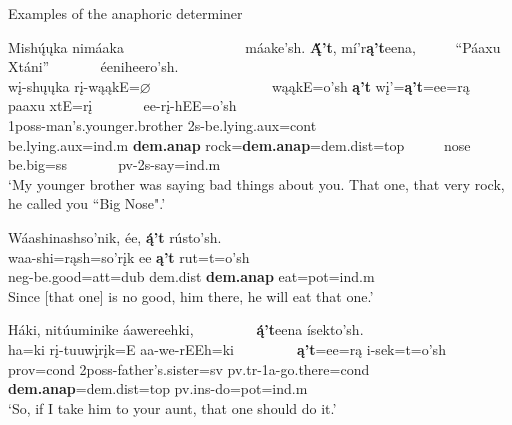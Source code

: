 \begin{exe}

\item\label{ExAnaphoricDets} Examples of the anaphoric determiner

\begin{xlist}

\item\label{ExAnaphoricDets1} \glll Mishų́ųka nimáaka ~ ~ ~ ~ ~ ~ ~ ~ ~ ~ máake'sh.  \textbf{Ą́'t}, mí'r\textbf{ą't}eena, ~ ~ ~  ``Páaxu Xtáni'' ~ ~ ~ ~ éeniheero'sh.\\
    wį-shųųka rį-wąąkE=$\varnothing$ ~ ~ ~ ~ ~ ~ ~ ~ ~ ~  wąąkE=o'sh \textbf{ą't} wį'=\textbf{ą't}=ee=rą ~ ~ ~ paaxu xtE=rį ~ ~ ~ ~  ee-rį-hEE=o'sh\\
    1poss-\textnormal{man's.younger.brother} 2s-\textnormal{be.lying}.aux=cont ~ ~ ~ ~ ~ ~ ~ ~ ~ ~ \textnormal{be.lying}.aux=ind.m \textbf{dem.anap} \textnormal{rock}=\textbf{dem.anap}=dem.dist=top ~ ~ ~ \textnormal{nose} \textnormal{be.big}=ss ~ ~ ~ ~ pv-2s-\textnormal{say}=ind.m\\
    \glt `My younger brother was saying bad things about you. That one, that very rock, he called you ``Big Nose{"}.' \citep[18]{hollow1973a}
    
\item\label{ExAnaphoricDets2} \glll Wáashinashso'nik, ée, \textbf{ą́'t} rústo'sh.\\
    waa-shi=rąsh=so'rįk ee \textbf{ą't} rut=t=o'sh\\
    neg-\textnormal{be.good}=att=dub dem.dist \textbf{dem.anap} \textnormal{eat}=pot=ind.m\\
    \glt Since [that one] is no good, him there, he will eat that one.' \citep[43]{hollow1973a}

\item\label{ExAnaphoricDets3} \glll Háki, nitúuminike áawereehki, ~ ~ ~ ~ ~  \textbf{ą́'t}eena ísekto'sh.\\
    ha=ki rį-tuuwįrįk=E aa-we-rEEh=ki ~ ~ ~ ~ ~ \textbf{ą't}=ee=rą i-sek=t=o'sh\\
    prov=cond 2poss-\textnormal{father's.sister}=sv pv.tr-1a-\textnormal{go.there}=cond ~ ~ ~ ~ ~ \textbf{dem.anap}=dem.dist=top pv.ins-\textnormal{do}=pot=ind.m\\
    \glt `So, if I take him to your aunt, that one should do it.' \citep[57]{hollow1973a}
    

\end{xlist}
\end{exe}
